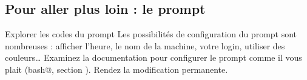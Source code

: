\documentclass[a4paper,11pt]{style-esi/td}
\begin{document}
        \subsection{Pour aller plus loin : le prompt}
    
            \begin{Exercice}{Explorer les codes du prompt}
                Les possibilités de configuration du prompt sont nombreuses : 
                afficher l'heure, le nom de la machine, votre login,
                utiliser des couleurs\dots{}
                Examinez la documentation pour configurer le prompt comme il 
                vous plait (\verb@man bash@, section \verb@PROMPTING@).
                Rendez la modification permanente.
            \end{Exercice}	
            
\end{document}
